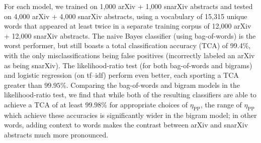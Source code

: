 \documentclass[paperwidth=40in,paperheight=32in,margin=1in,fontscale=0.33]{baposter}
\begin{document}
\begin{poster}
{For each model, we trained on 1,000 arXiv + 1,000 snarXiv abstracts and tested on 4,000 arXiv + 4,000 snarXiv abstracts, using a vocabulary of 15,315 unique words that appeared at least twice in a separate training corpus of 12,000 arXiv + 12,000 snarXiv abstracts.
The naive Bayes classifier (using bag-of-words) is the worst performer, but still boasts a total classification accuracy (TCA) of 99.4\%, with the only misclassifications being false positives (incorrectly labeled an arXiv as being snarXiv).
The likelihood-ratio test (for both bag-of-words and bigrams) and logistic regression (on tf--idf) perform even better, each sporting a TCA greater than $99.95\%$.
Comparing the bag-of-words and bigram models in the likelihood-ratio test, we find that while both of the resulting classifiers are able to achieve a TCA of at least $99.98\%$ for appropriate choices of $\eta_\text{PP}$, the range of $\eta_\text{PP}$ which achieve these accuracies is significantly wider in the bigram model; in other words, adding context to words makes the contrast between arXiv and snarXiv abstracts much more pronounced.
}
\setlength{\fboxsep}{1mm}








\end{poster}
\end{document}
